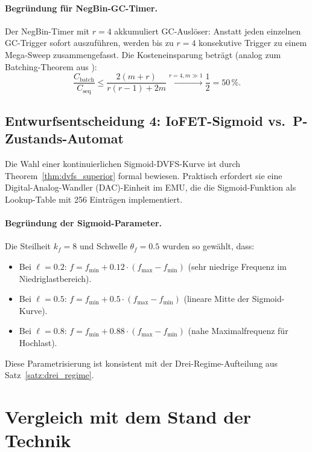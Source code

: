 ﻿\documentclass[a4paper,12pt]{scrreprt}
\theoremstyle{definition}
\begin{document}
	\paragraph{Begründung für NegBin-GC-Timer.}
	Der NegBin-Timer mit $r = 4$ akkumuliert GC-Auslöser: Anstatt jeden
	einzelnen GC-Trigger sofort auszuführen, werden bis zu $r = 4$
	konsekutive Trigger zu einem Mega-Sweep zusammengefasst. Die
	Kosteneinsparung beträgt (analog zum Batching-Theorem aus \cite{epp2026archiv}):
	\[
	\frac{C_{\mathrm{batch}}}{C_{\mathrm{seq}}} \le \frac{2(m+r)}{r(r-1)+2m}
	\xrightarrow{r=4, m \gg 1} \frac{1}{2} = 50\,\%.
	\]
	
	\subsection{Entwurfsentscheidung 4: IoFET-Sigmoid vs.\ P-Zustands-Automat}
	
	Die Wahl einer kontinuierlichen Sigmoid-DVFS-Kurve ist durch
	Theorem~\ref{thm:dvfs_superior} formal bewiesen. Praktisch
	erfordert sie eine Digital-Analog-Wandler (DAC)-Einheit im EMU,
	die die Sigmoid-Funktion als Lookup-Table mit 256 Einträgen
	implementiert.
	
	\paragraph{Begründung der Sigmoid-Parameter.}
	Die Steilheit $k_f = 8$ und Schwelle $\theta_f = 0.5$ wurden so
	gewählt, dass:
	\begin{itemize}[noitemsep]
		\item Bei $\ell = 0.2$: $f = f_{\min} + 0.12 \cdot (f_{\max} - f_{\min})$
		(sehr niedrige Frequenz im Niedriglastbereich).
		\item Bei $\ell = 0.5$: $f = f_{\min} + 0.5 \cdot (f_{\max} - f_{\min})$
		(lineare Mitte der Sigmoid-Kurve).
		\item Bei $\ell = 0.8$: $f = f_{\min} + 0.88 \cdot (f_{\max} - f_{\min})$
		(nahe Maximalfrequenz für Hochlast).
	\end{itemize}
	Diese Parametrisierung ist konsistent mit der Drei-Regime-Aufteilung
	aus Satz~\ref{satz:drei_regime}.
	
	\section{Vergleich mit dem Stand der Technik}
	
\end{document}
